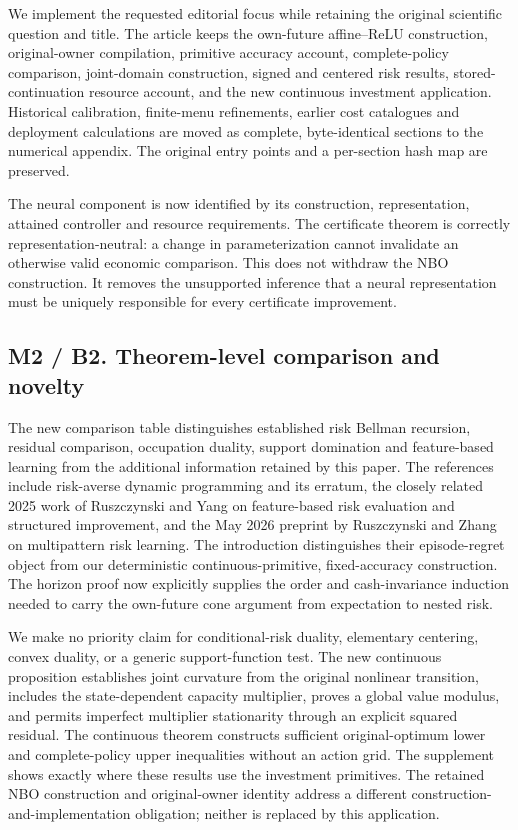 We implement the requested editorial focus while retaining the original
scientific question and title. The article keeps the own-future
affine--ReLU construction, original-owner compilation, primitive
accuracy account, complete-policy comparison, joint-domain construction,
signed and centered risk results, stored-continuation resource account,
and the new continuous investment application. Historical calibration,
finite-menu refinements, earlier cost catalogues and deployment
calculations are moved as complete, byte-identical sections to the
numerical appendix. The original entry points and a per-section hash map
are preserved.

The neural component is now identified by its construction,
representation, attained controller and resource requirements. The
certificate theorem is correctly representation-neutral: a change in
parameterization cannot invalidate an otherwise valid economic
comparison. This does not withdraw the NBO construction. It removes the
unsupported inference that a neural representation must be uniquely
responsible for every certificate improvement.

\hypertarget{m2-b2.-theorem-level-comparison-and-novelty}{%
\subsection{M2 / B2. Theorem-level comparison and
novelty}\label{m2-b2.-theorem-level-comparison-and-novelty}}

The new comparison table distinguishes established risk Bellman
recursion, residual comparison, occupation duality, support domination
and feature-based learning from the additional information retained by
this paper. The references include risk-averse dynamic programming and
its erratum, the closely related 2025 work of Ruszczynski and Yang on
feature-based risk evaluation and structured improvement, and the May
2026 preprint by Ruszczynski and Zhang on multipattern risk learning.
The introduction distinguishes their episode-regret object from our
deterministic continuous-primitive, fixed-accuracy construction. The
horizon proof now explicitly supplies the order and cash-invariance
induction needed to carry the own-future cone argument from expectation
to nested risk.

We make no priority claim for conditional-risk duality, elementary
centering, convex duality, or a generic support-function test. The new
continuous proposition establishes joint curvature from the original
nonlinear transition, includes the state-dependent capacity multiplier,
proves a global value modulus, and permits imperfect multiplier
stationarity through an explicit squared residual. The continuous
theorem constructs sufficient original-optimum lower and complete-policy
upper inequalities without an action grid. The supplement shows exactly
where these results use the investment primitives. The retained NBO
construction and original-owner identity address a different
construction-and-implementation obligation; neither is replaced by this
application.

